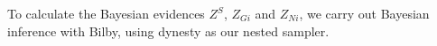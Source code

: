\documentclass[%
 reprint,
 amsmath,amssymb,
 aps,
]{revtex4}
\newcommand{\bilby}{{\sc Bilby}\xspace}
\newcommand{\dynesty}{{\sc dynesty}\xspace}
\begin{document}
To calculate the Bayesian evidences $Z^S$, $Z_{Gi}$ and $Z_{Ni}$, we carry out Bayesian inference with \bilby \cite{bilby}, using \dynesty \cite{dynesty} as our nested sampler. 



 
 
 
 
\end{document}
